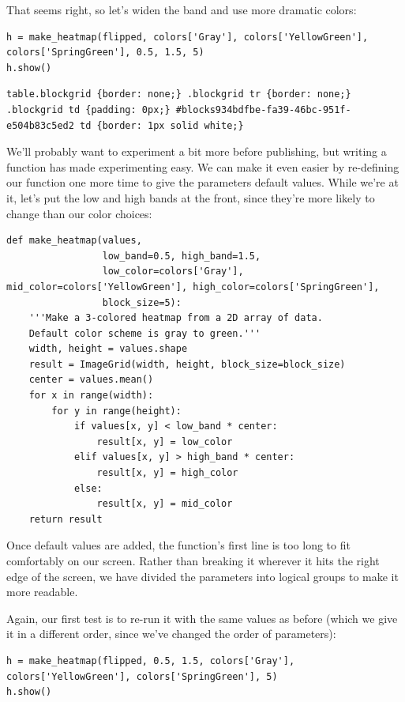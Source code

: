 \documentclass[]{book}
\begin{document}
That seems right, so let's widen the band and use more dramatic colors:

\begin{verbatim}
h = make_heatmap(flipped, colors['Gray'], colors['YellowGreen'], colors['SpringGreen'], 0.5, 1.5, 5)
h.show()
\end{verbatim}

\begin{verbatim}
table.blockgrid {border: none;} .blockgrid tr {border: none;} .blockgrid td {padding: 0px;} #blocks934bdfbe-fa39-46bc-951f-e504b83c5ed2 td {border: 1px solid white;}
\end{verbatim}

We'll probably want to experiment a bit more before publishing, but
writing a function has made experimenting easy. We can make it even
easier by re-defining our function one more time to give the parameters
default values. While we're at it, let's put the low and high bands at
the front, since they're more likely to change than our color choices:

\begin{verbatim}
def make_heatmap(values,
                 low_band=0.5, high_band=1.5,
                 low_color=colors['Gray'], mid_color=colors['YellowGreen'], high_color=colors['SpringGreen'],
                 block_size=5):
    '''Make a 3-colored heatmap from a 2D array of data.
    Default color scheme is gray to green.'''
    width, height = values.shape
    result = ImageGrid(width, height, block_size=block_size)
    center = values.mean()
    for x in range(width):
        for y in range(height):
            if values[x, y] < low_band * center:
                result[x, y] = low_color
            elif values[x, y] > high_band * center:
                result[x, y] = high_color
            else:
                result[x, y] = mid_color
    return result
\end{verbatim}

Once default values are added, the function's first line is too long to
fit comfortably on our screen. Rather than breaking it wherever it hits
the right edge of the screen, we have divided the parameters into
logical groups to make it more readable.

Again, our first test is to re-run it with the same values as before
(which we give it in a different order, since we've changed the order of
parameters):

\begin{verbatim}
h = make_heatmap(flipped, 0.5, 1.5, colors['Gray'], colors['YellowGreen'], colors['SpringGreen'], 5)
h.show()
\end{verbatim}
\end{document}
